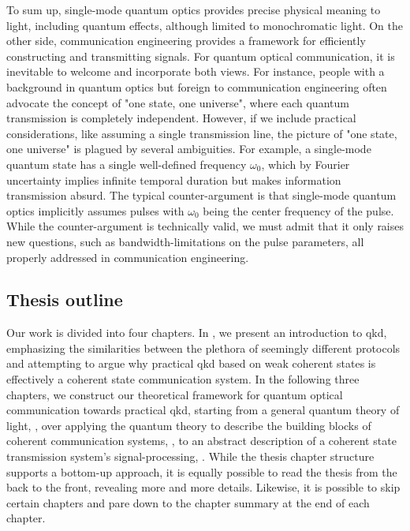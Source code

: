 To sum up, single-mode quantum optics provides precise physical meaning to light, including quantum effects, although limited to monochromatic light.
On the other side, communication engineering provides a framework for efficiently constructing and transmitting signals.
For quantum optical communication, it is inevitable to welcome and incorporate both views.
For instance, people with a background in quantum optics but foreign to communication engineering often advocate the concept of "one state, one universe", where each quantum transmission is completely independent.
However, if we include practical considerations, like assuming a single transmission line, the picture of "one state, one universe" is plagued by several ambiguities.
For example, a single-mode quantum state has a single well-defined frequency $\omega_0$, which by Fourier uncertainty implies infinite temporal duration but makes information transmission absurd.
The typical counter-argument is that single-mode quantum optics implicitly assumes pulses with $\omega_0$ being the center frequency of the pulse.
While the counter-argument is technically valid, we must admit that it only raises new questions, such as bandwidth-limitations on the pulse parameters, all properly addressed in communication engineering.


\subsection*{Thesis outline}

Our work is divided into four chapters.
In , we present an introduction to \gls{qkd}, emphasizing the similarities between the plethora of seemingly different protocols and attempting to argue why practical \gls{qkd} based on weak coherent states is effectively a coherent state communication system.
In the following three chapters, we construct our theoretical framework for quantum optical communication towards practical \gls{qkd}, starting from a general quantum theory of light, , over applying the quantum theory to describe the building blocks of coherent communication systems, , to an abstract description of a coherent state transmission system's signal-processing, .
While the thesis chapter structure supports a bottom-up approach, it is equally possible to read the thesis from the back to the front, revealing more and more details.
Likewise, it is possible to skip certain chapters and pare down to the chapter summary at the end of each chapter.